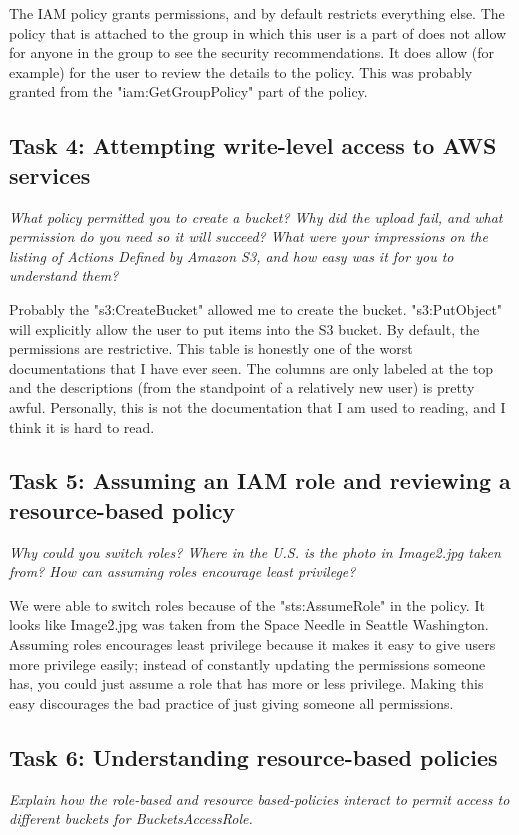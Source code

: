 \documentclass[11pt]{article}
\begin{document}
The IAM policy grants permissions, and by default restricts everything else. The policy that is attached to the group in which this user is a part of does not allow for anyone in the group to see the security recommendations. It does allow (for example) for the user to review the details to the policy. This was probably granted from the "iam:GetGroupPolicy" part of the policy.


\subsection*{Task 4: Attempting write-level access to AWS services}
\textit{What policy permitted you to create a bucket? Why did the upload fail, and what permission do you need so it will succeed? What were your impressions on the listing of Actions Defined by Amazon S3, and how easy was it for you to understand them?}

Probably the "s3:CreateBucket" allowed me to create the bucket. "s3:PutObject" will explicitly allow the user to put items into the S3 bucket. By default, the permissions are restrictive. This table is honestly one of the worst documentations that I have ever seen. The columns are only labeled at the top and the descriptions (from the standpoint of a relatively new user) is pretty awful. Personally, this is not the documentation that I am used to reading, and I think it is hard to read.


\subsection*{Task 5: Assuming an IAM role and reviewing a resource-based policy}
\textit{Why could you switch roles? Where in the U.S. is the photo in Image2.jpg taken from? How can assuming roles encourage least privilege?}

We were able to switch roles because of the "sts:AssumeRole" in the policy. It looks like Image2.jpg was taken from the Space Needle in Seattle Washington. Assuming roles encourages least privilege because it makes it easy to give users more privilege easily; instead of constantly updating the permissions someone has, you could just assume a role that has more or less privilege. Making this easy discourages the bad practice of just giving someone all permissions.


\subsection*{Task 6: Understanding resource-based policies}
\textit{Explain how the role-based and resource based-policies interact to permit access to different buckets for BucketsAccessRole.}
\end{document}
